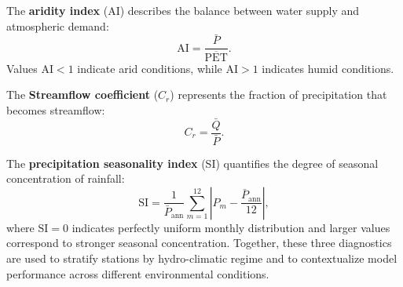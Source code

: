 The \textbf{aridity index} (AI)\cite{zomer2022version} describes the balance between water supply and atmospheric demand:
\begin{equation}
    \mathrm{AI}=\frac{\bar{P}}{\overline{\mathrm{PET}}}.
\end{equation}
Values $\mathrm{AI}<1$ indicate arid conditions, while $\mathrm{AI}>1$ indicates humid conditions.

The \textbf{Streamflow coefficient} ($C_r$)\cite{WRR_coefficient} represents the fraction of precipitation that becomes streamflow:
\begin{equation}
    C_r=\frac{\bar{Q}}{\bar{P}}.
\end{equation}

The \textbf{precipitation seasonality index} (SI)\cite{SI} quantifies the degree of seasonal concentration of rainfall:
\begin{equation}
    \mathrm{SI}=\frac{1}{\bar{P}_{\mathrm{ann}}}\sum_{m=1}^{12}\left|P_m-\frac{\bar{P}_{\mathrm{ann}}}{12}\right|,
\end{equation}
where $\mathrm{SI}=0$ indicates perfectly uniform monthly distribution and larger values correspond to stronger seasonal concentration. Together, these three diagnostics are used to stratify stations by hydro-climatic regime and to contextualize model performance across different environmental conditions.